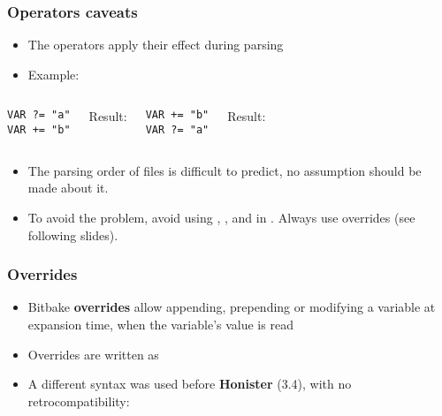 \begin{frame}[fragile]
  \frametitle{Operators caveats}
  \begin{itemize}
    \item The operators apply their effect during parsing
    \item Example:
  \end{itemize}
  \begin{columns}
    \begin{block}{}
      \begin{verbatim}
VAR ?= "a"
VAR += "b"
      \end{verbatim}
    \end{block}
    Result: 
    \break
    \begin{block}{}
      \begin{verbatim}
VAR += "b"
VAR ?= "a"
      \end{verbatim}
    \end{block}
    Result: 
    \break
  \end{columns}

  \begin{itemize}
    \item The parsing order of files is difficult to predict, no assumption
      should be made about it.
    \item To avoid the problem, avoid using \code{+=}, \code{=+}, 
      and  in . Always use
      overrides (see following slides).
  \end{itemize}
\end{frame}

\begin{frame}
  \frametitle{Overrides}
  \begin{itemize}
  \item Bitbake \textbf{overrides} allow appending, prepending or modifying
    a variable at expansion time, when the variable's value is read
  \item Overrides are written as 
  \item A different syntax was used before \textbf{Honister} (3.4), with no
    retrocompatibility: 
  \end{itemize}
\end{frame}

